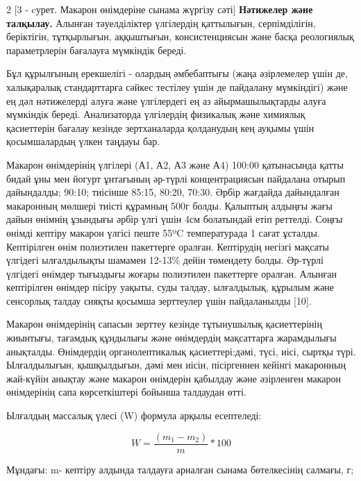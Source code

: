 \begin{multicols}{2}
[3 - cурет. Макарон өнімдеріне сынама жүргізу сәті]
\vspace{-0.5cm}
{\bfseries Нәтижелер және талқылау.} Алынған тәуелділіктер үлгілердің
қаттылығын, серпімділігін, беріктігін, тұтқырлығын, аққыштығын,
консистенциясын және басқа реологиялық параметрлерін бағалауға мүмкіндік
береді.

Бұл құрылғының ерекшелігі - олардың әмбебаптығы (жаңа әзірлемелер үшін
де, халықаралық стандарттарға сәйкес тестілеу үшін де пайдалану
мүмкіндігі) және ең дәл нәтижелерді алуға және үлгілердегі ең аз
айырмашылықтарды алуға мүмкіндік береді. Анализаторда үлгілердің
физикалық және химиялық қасиеттерін бағалау кезінде зертханаларда
қолданудың кең ауқымы үшін қосымшалардың үлкен таңдауы бар.

Макарон өнімдерінің үлгілері (А1, А2, А3 және А4) 100:00 қатынасында
қатты бидай ұны мен йогурт ұнтағының әр-түрлі концентрациясын пайдалана
отырып дайындалды; 90:10; тиісінше 85:15, 80:20, 70:30. Әрбір жағдайда
дайындалған макаронның мөлшері тиісті құрамның 500г болды. Қалыптың
алдыңғы жағы дайын өнімнің ұзындығы әрбір үлгі үшін 4см болатындай етіп
реттелді. Соңғы өнімді кептіру макарон үлгісі пеште 55ºC температурада 1
сағат ұсталды. Кептірілген өнім полиэтилен пакеттерге оралған.
Кептірудің негізгі мақсаты үлгідегі ылғалдылықты шамамен 12-13\% дейін
төмендету болды. Әр-түрлі үлгідегі өнімдер тығыздығы жоғары полиэтилен
пакеттерге оралған. Алынған кептірілген өнімдер пісіру уақыты, суды
талдау, ылғалдылық, құрылым және сенсорлық талдау сияқты қосымша
зерттеулер үшін пайдаланылды {[}10{]}.

Макарон өнімдерінің сапасын зерттеу кезінде тұтынушылық қасиеттерінің
жиынтығы, тағамдық құндылығы және өнімдердің мақсаттарға жарамдылығы
анықталды. Өнімдердің органолептикалық қасиеттері:дәмі, түсі, иісі,
сыртқы түрі. Ылғалдылығын, қышқылдығын, дәмі мен иісін, пісіргеннен
кейінгі макаронның жай-күйін анықтау және макарон өнімдерін қабылдау
және әзірленген макарон өнімдерінің сапа көрсеткіштері бойынша талдаудан
өтті.

Ылғалдың массалық үлесі (W) формула арқылы есептеледі:

\begin{equation}
W = \frac{\left( m_{1} - m_{2} \right)}{m}*100
\end{equation}

Мұндағы: m- кептіру алдында талдауға арналған сынама
бөтелкесінің салмағы, г;


\end{multicols}
